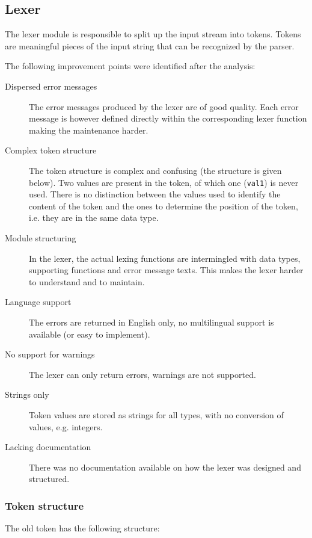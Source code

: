 
\subsection{Lexer}
\label{analysis:lexer}
The lexer module is responsible to split up the input stream into tokens.
Tokens are meaningful pieces of the input string that can be recognized by the parser.

The following improvement points were identified after the analysis:
\begin{description}
  \item[Dispersed error messages]
    The error messages produced by the lexer are of good quality.
    Each error message is however defined directly within the corresponding lexer function making the maintenance harder.
  \item[Complex token structure]
    The token structure is complex and confusing (the structure is given below).
    Two values are present in the token, of which one (\texttt{val1}) is never used.
    There is no distinction between the values used to identify the content of the token and the ones to determine the position of the token, i.e. they are in the same data type.
  \item[Module structuring]
    In the lexer, the actual lexing functions are intermingled with data types, supporting functions and error message texts.
    This makes the lexer harder to understand and to maintain.
  \item[Language support]
    The errors are returned in English only, no multilingual support is available (or easy to implement).
  \item[No support for warnings]
    The lexer can only return errors, warnings are not supported.
  \item[Strings only]
    Token values are stored as strings for all types, with no conversion of values, e.g. integers.
  \item[Lacking documentation]
    There was no documentation available on how the lexer was designed and structured.
\end{description}

\subsubsection{Token structure}
\label{lexer-token}
The old token has the following structure:

